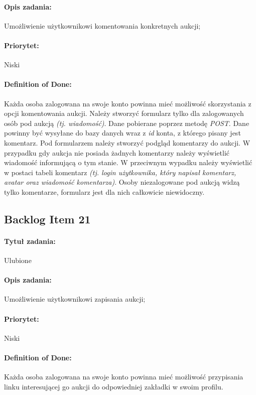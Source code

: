 \documentclass[a4paper]{article}
\begin{document}
	\paragraph{Opis zadania:} Umożliwienie użytkownikowi komentowania konkretnych aukcji;
	\paragraph{Priorytet:} Niski
	\paragraph{Definition of Done:} Każda osoba zalogowana na swoje konto powinna mieć możliwość skorzystania z opcji komentowania aukcji. Należy stworzyć formularz tylko dla zalogowanych osób pod aukcją \emph{(tj. wiadomość)}. Dane pobierane poprzez metodę \emph{POST}. Dane powinny być wysyłane do bazy danych wraz z \emph{id} konta, z którego pisany jest komentarz. Pod formularzem należy stworzyć podgląd komentarzy do aukcji. W przypadku gdy aukcja nie posiada żadnych komentarzy należy wyświetlić wiadomość informującą o tym stanie. W przeciwnym wypadku należy wyświetlić w postaci tabeli komentarz \emph{(tj. login użytkownika, który napisał komentarz, avatar oraz wiadomość komentarza)}. Osoby niezalogowane pod aukcją widzą tylko komentarze, formularz jest dla nich całkowicie niewidoczny.
	
	\subsection{Backlog Item 21}
	\paragraph{Tytuł zadania:} Ulubione
	\paragraph{Opis zadania:} Umożliwienie użytkownikowi zapisania aukcji;
	\paragraph{Priorytet:} Niski
	\paragraph{Definition of Done:} Każda osoba zalogowana na swoje konto powinna mieć możliwość przypisania linku interesującej go aukcji do odpowiedniej zakładki w swoim profilu.
	
\end{document}

